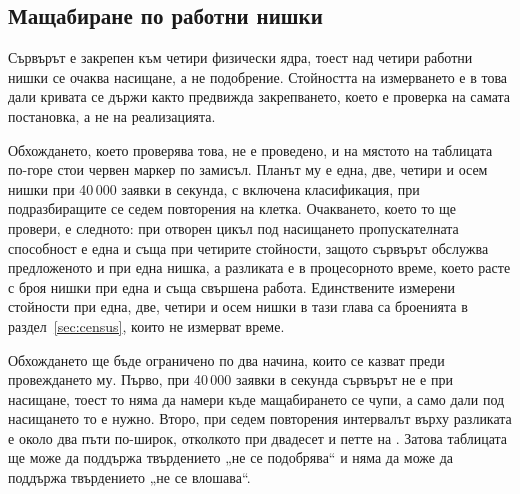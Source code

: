 \subsection{Мащабиране по работни нишки}
\label{sec:workers}


Сървърът е закрепен към четири физически ядра, тоест над четири работни нишки се очаква
насищане, а не подобрение. Стойността на измерването е в това дали кривата се държи както
предвижда закрепването, което е проверка на самата постановка, а не на реализацията.

Обхождането, което проверява това, не е проведено, и на мястото на таблицата по-горе стои
червен маркер по замисъл. Планът му е една, две, четири и осем нишки при 40\,000 заявки в
секунда, с включена класификация, при подразбиращите се седем повторения на клетка.
Очакването, което то ще провери, е следното: при отворен цикъл под насищането
пропускателната способност е една и съща при четирите стойности, защото сървърът обслужва
предложеното и при една нишка, а разликата е в процесорното време, което расте с броя нишки
при една и съща свършена работа. Единствените измерени стойности при една, две, четири и
осем нишки в тази глава са броенията в раздел~\ref{sec:census}, които не измерват време.

Обхождането ще бъде ограничено по два начина, които се казват преди провеждането му. Първо,
при 40\,000 заявки в секунда сървърът не е при насищане, тоест то няма да намери къде
мащабирането се чупи, а само дали под насищането то е нужно. Второ, при седем повторения
интервалът върху разликата е около два пъти по-широк, отколкото при двадесет и петте на
. Затова таблицата ще може да поддържа твърдението „не се подобрява“ и няма да
може да поддържа твърдението „не се влошава“.

